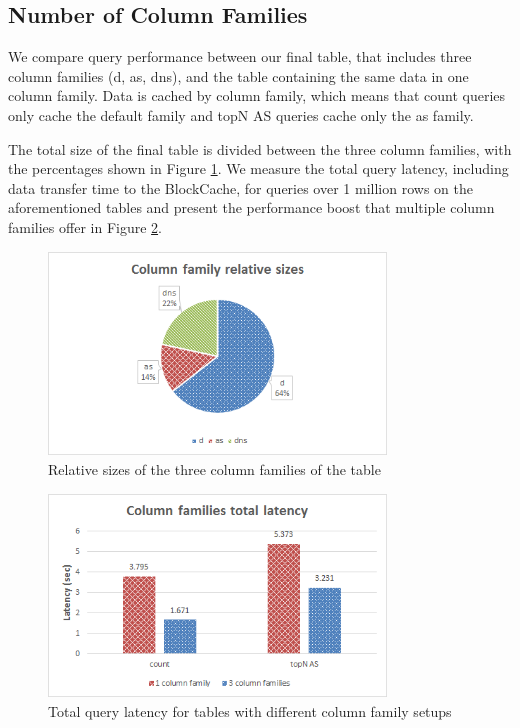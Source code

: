 \subsection{Number of Column Families}

We compare query performance between our final table, that includes three column families (d, as, dns), and the table containing the same data in one column family. Data is cached by column family, which means that count queries only cache the default family and topN AS queries cache only the as family.

The total size of the final table is divided between the three column families, with the percentages shown in Figure \ref{figure:benchmarks_hbase_cf_sizes}. We measure the total query latency, including data transfer time to the BlockCache, for queries over 1 million rows on the aforementioned tables and present the performance boost that multiple column families offer in Figure \ref{figure:benchmarks_hbase_cf_total_latency}.

\begin{figure}[H]
\centering
\includegraphics[width=0.8\textwidth]{figures/benchmarks_hbase_cf_sizes}
\caption{Relative sizes of the three column families of the table}
\label{figure:benchmarks_hbase_cf_sizes}
\end{figure}

\begin{figure}[H]
\centering
\includegraphics[width=0.8\textwidth]{figures/benchmarks_hbase_cf_total_latency}
\caption{Total query latency for tables with different column family setups}
\label{figure:benchmarks_hbase_cf_total_latency}
\end{figure}


